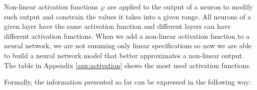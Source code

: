 \documentclass[11pt]{article}
\newcommand{\kolja}[1]{\textcolor{red}{#1}}
\theoremstyle{definition}
\begin{document}
Non-linear activation functions $\varphi$ are applied to the output of a neuron to modify such output and constrain the values it takes into a given range. All neurons of a given layer have the same activation function and different layers can have different activation functions. When we add a non-linear activation function to a neural network, we are not summing only linear specifications so now we are able to build a neural network model that better approximates a non-linear output. The table in Appendix \ref{apx:activation} shows the most used activation functions.


Formally, the information presented so far can be expressed in the following way:  
\end{document}
